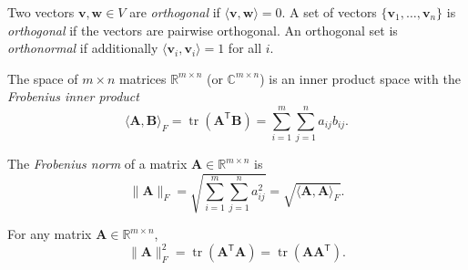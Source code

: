 \begin{definition}[Orthogonality]
  Two vectors $\mathbf{v}, \mathbf{w} \in V$ are \emph{orthogonal} if $\langle \mathbf{v}, \mathbf{w} \rangle = 0$.
  A set of vectors $\{\mathbf{v}_1,\dots,\mathbf{v}_n\}$ is \emph{orthogonal} if the vectors are pairwise orthogonal.
  An orthogonal set is \emph{orthonormal} if additionally $\langle \mathbf{v}_i, \mathbf{v}_i \rangle = 1$ for all $i$.
\end{definition}

\begin{definition}
  The space of $m \times n$ matrices $\mathbb{R}^{m \times n}$ (or $\mathbb{C}^{m \times n}$) is an inner product space with the \emph{Frobenius inner product}
  \begin{equation}
    \langle \mathbf{A}, \mathbf{B} \rangle_F = \operatorname{tr}(\mathbf{A}^{\mathsf{T}}\mathbf{B}) = \sum_{i=1}^{m}\sum_{j=1}^{n} a_{ij}b_{ij}.
  \end{equation}
\end{definition}

\begin{definition}
  The \emph{Frobenius norm} of a matrix $\mathbf{A} \in \mathbb{R}^{m \times n}$ is
  \begin{equation}
    \|\mathbf{A}\|_F = \sqrt{\sum_{i=1}^{m}\sum_{j=1}^{n} a_{ij}^2} = \sqrt{\langle \mathbf{A}, \mathbf{A} \rangle_F}.
  \end{equation}
\end{definition}

\begin{proposition}\label{prop:frobenius-trace}
  For any matrix $\mathbf{A} \in \mathbb{R}^{m \times n}$,
  \begin{equation}\label{eq:frobenius-trace}
    \|\mathbf{A}\|_F^2 = \operatorname{tr}(\mathbf{A}^{\mathsf{T}}\mathbf{A}) = \operatorname{tr}(\mathbf{A}\mathbf{A}^{\mathsf{T}}).
  \end{equation}
\end{proposition}

